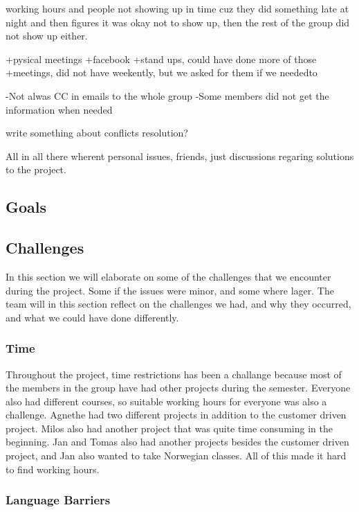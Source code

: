 working hours and people not showing up in time cuz they did something late at night and then figures it was okay not to show up, then the rest of the group did not show up either.


+pysical meetings
+facebook
+stand ups, could have done more of those
+meetings, did not have weekently, but we asked for them if we neededto

-Not alwas CC in emails to the whole group
-Some members did not get the information when needed 


write something about conflicts resolution?

All in all there wherent personal issues, friends, just discussions regaring solutions to the project. 

\subsection{Goals} 


\subsection{Challenges}

In this section we will elaborate on some of the challenges that we encounter during the project. Some if the issues were minor, and some where lager. The team will in this section reflect on the challenges we had, and why they occurred, and what we could have done differently.

\subsubsection{Time}

Throughout the project, time restrictions has been a challange because most of the members in the group have had other projects during the semester. Everyone also had different courses, so suitable working hours for everyone was also a challenge. Agnethe had two different projects in addition to the customer driven project. Milos also had another project that was quite time consuming in the beginning. Jan and Tomas also had another projects besides the customer driven project, and Jan also wanted to take Norwegian classes. All of this made it hard to find working hours. 

\subsubsection{Language Barriers}


